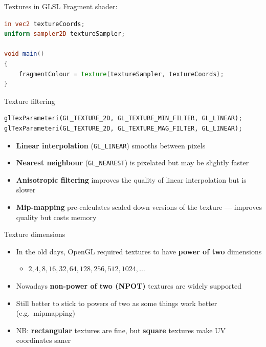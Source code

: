
\begin{frame}[fragile]{Textures in GLSL}
	Fragment shader:
	
	\begin{lstlisting}[language=GLSL]
in vec2 textureCoords;
uniform sampler2D textureSampler;

void main()
{
    fragmentColour = texture(textureSampler, textureCoords);
}
	\end{lstlisting}
\end{frame}

\begin{frame}[fragile]{Texture filtering}
	\pause
	\begin{lstlisting}
glTexParameteri(GL_TEXTURE_2D, GL_TEXTURE_MIN_FILTER, GL_LINEAR);
glTexParameteri(GL_TEXTURE_2D, GL_TEXTURE_MAG_FILTER, GL_LINEAR);
	\end{lstlisting}
	\begin{itemize}
		\pause\item \textbf{Linear interpolation} (\lstinline{GL_LINEAR})
			smooths between pixels
		\pause\item \textbf{Nearest neighbour} (\lstinline{GL_NEAREST})
			is pixelated but may be slightly faster
		\pause\item \textbf{Anisotropic filtering} improves the quality of linear interpolation
			but is slower
		\pause\item \textbf{Mip-mapping} pre-calculates scaled down versions of the texture ---
			improves quality but costs memory
	\end{itemize}
\end{frame}

\begin{frame}{Texture dimensions}
	\begin{itemize}
		\pause\item In the old days, OpenGL required textures to have \textbf{power of two} dimensions
			\begin{itemize}
				\pause\item $2, 4, 8, 16, 32, 64, 128, 256, 512, 1024, \dots$
			\end{itemize}
		\pause\item Nowadays \textbf{non-power of two (NPOT)} textures are widely supported
		\pause\item Still better to stick to powers of two as some things work better (e.g.\ mipmapping)
		\pause\item NB: \textbf{rectangular} textures are fine, but \textbf{square} textures make UV coordinates saner
	\end{itemize}
\end{frame}
